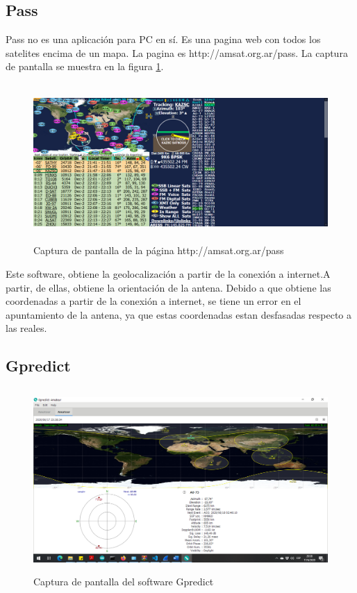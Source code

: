 \subsection{Pass}
Pass no es una aplicación para PC en sí. Es una pagina web con todos los satelites encima de un mapa. La pagina es http://amsat.org.ar/pass. La captura de pantalla se muestra en la figura \ref{fig:iu_pass}.
\begin{figure}[ht]
	\centering
	\includegraphics[width=\linewidth, height= 6cm]{pass}
	\caption{Captura de pantalla de la página http://amsat.org.ar/pass }
	\label{fig:iu_pass}
\end{figure}

Este software, obtiene la geolocalización a partir de la conexión a internet.A partir, de ellas, obtiene la orientación de la antena. Debido a que obtiene las coordenadas a partir de la conexión a internet, se tiene un error en el apuntamiento de la antena, ya que estas coordenadas estan desfasadas respecto a las reales.    

\subsection{Gpredict}
\begin{figure}[h]
	\centering
	\includegraphics[width=\linewidth,height=7cm]{gpredict}
	\caption{Captura de pantalla del software Gpredict}
	\label{fig:iu_gpredict}
\end{figure}

